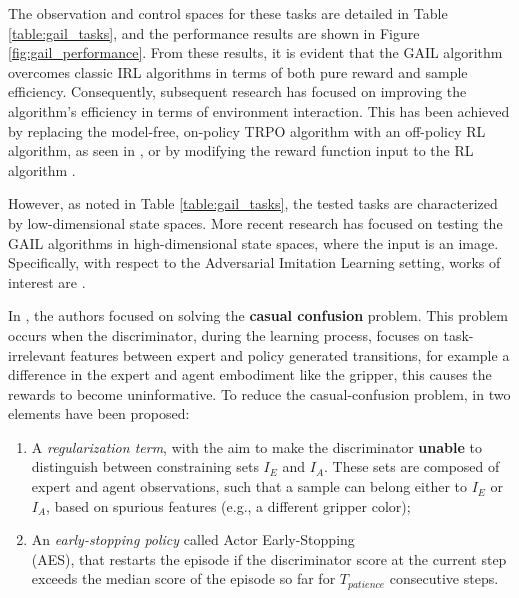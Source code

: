 
 

The observation and control spaces for these tasks are detailed in Table \ref{table:gail_tasks}, and the performance results are shown in Figure \ref{fig:gail_performance}. From these results, it is evident that the GAIL algorithm overcomes classic IRL algorithms in terms of both pure reward and sample efficiency. Consequently, subsequent research has focused on improving the algorithm's efficiency in terms of environment interaction. This has been achieved by replacing the model-free, on-policy TRPO algorithm with an off-policy RL algorithm, as seen in \cite{kostrikov2018discriminator}, or by modifying the reward function input to the RL algorithm \cite{fu2018airl,ghasemipour2020divergence_minimization_perspective}.

However, as noted in Table \ref{table:gail_tasks}, the tested tasks are characterized by low-dimensional state spaces. More recent research \cite{liu2018imitation_from_observation,reddy2019sqil,zolna2021task_relevant_ail,rafailov2021visual_ail} has focused on testing the GAIL algorithms in high-dimensional state spaces, where the input is an image. Specifically, with respect to the Adversarial Imitation Learning setting, works of interest are \cite{zolna2021task_relevant_ail,rafailov2021visual_ail}. 

In \cite{zolna2021task_relevant_ail}, the authors focused on solving the \textbf{casual confusion} problem. This problem occurs when the discriminator, during the learning process, focuses on task-irrelevant features between expert and policy generated transitions, for example a difference in the expert and agent embodiment like the gripper, this causes the rewards to become uninformative. To reduce the casual-confusion problem, in \cite{zolna2021task_relevant_ail} two elements have been proposed: 
\begin{enumerate}[label=\arabic*.]
    \item A \textit{regularization term}, with the aim to make the discriminator \textbf{unable} to distinguish between constraining sets $I_{E}$ and $I_{A}$. These sets are composed of expert and agent observations, such that a sample can belong either to $I_{E}$ or $I_{A}$, based on spurious features (e.g., a different gripper color);
    \item An \textit{early-stopping policy} called Actor Early-Stopping \\ (AES), that restarts the episode if the discriminator score at the current step exceeds the median score of the episode so far for $T_{patience}$ consecutive steps.
\end{enumerate} 


